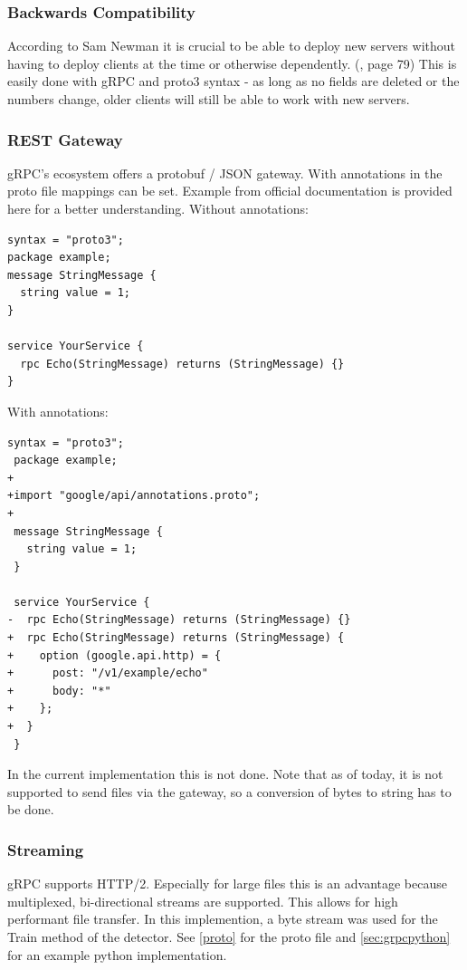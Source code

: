 \subsubsection{Backwards Compatibility}
According to Sam Newman it is crucial to be able to deploy new servers without having to deploy clients at the time or otherwise dependently. (\cite{Newman2015BuildingMicroservices}, page 79) This is easily done with gRPC and proto3 syntax - as long as no fields are deleted or the numbers change, older clients will still be able to work with new servers.
\subsubsection{REST Gateway}
gRPC's ecosystem offers a protobuf / JSON gateway. \cite{2018-11-242017Grpc-gateway} With annotations in the proto file mappings can be set. Example from official documentation is provided here for a better understanding. Without annotations:

\begin{lstlisting}[language=protobuf3,style=protobuf]
syntax = "proto3";
package example;
message StringMessage {
  string value = 1;
}

service YourService {
  rpc Echo(StringMessage) returns (StringMessage) {}
}
\end{lstlisting}

With annotations:

\begin{lstlisting}[language=protobuf3,style=protobuf]
 syntax = "proto3";
 package example;
+
+import "google/api/annotations.proto";
+
 message StringMessage {
   string value = 1;
 }

 service YourService {
-  rpc Echo(StringMessage) returns (StringMessage) {}
+  rpc Echo(StringMessage) returns (StringMessage) {
+    option (google.api.http) = {
+      post: "/v1/example/echo"
+      body: "*"
+    };
+  }
 }
\end{lstlisting}

In the current implementation this is not done. Note that as of today, it is not supported to send files via the gateway, so a conversion of bytes to string has to be done. 
\subsubsection{Streaming}
gRPC supports HTTP/2. Especially for large files this is an advantage because multiplexed, bi-directional streams are supported. This allows for high performant file transfer. In this implemention, a byte stream was used for the Train method of the detector. See \ref{proto} for the proto file and \ref{sec:grpcpython} for an example python implementation.

